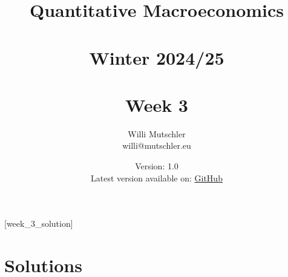 
\newif\ifDisplaySolutions\DisplaySolutionstrue%


\title{Quantitative Macroeconomics\\~\\Winter 2024/25\\~\\Week 3}
\author{Willi Mutschler\\willi@mutschler.eu}
\date{Version: 1.0\\Latest version available on: \href{https://github.com/wmutschl/Quantitative-Macroeconomics/releases/latest/download/week_3.pdf}{GitHub}}
\maketitle\thispagestyle{empty}

\newpage
{}[week_3_solution]
\tableofcontents\thispagestyle{empty}\newpage

\setcounter{page}{1}
\newpage
\newpage
\newpage
\newpage
\printbibliography%
\newpage

\ifDisplaySolutions%
\newpage
\appendix
\section{Solutions}

\fi

